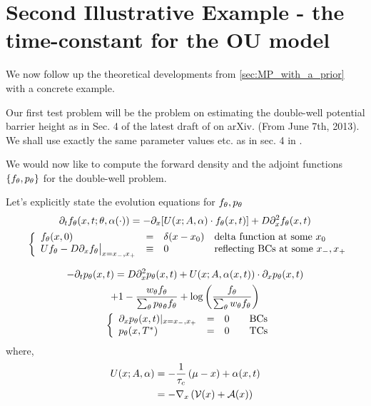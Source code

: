 \documentclass{article}
\begin{document}
\clearpage

\section{Second Illustrative Example - the time-constant for the OU model}
\label{sec:MP_Doublewell_TimeDependent}
We now follow up the theoretical developments from \cref{sec:MP_with_a_prior}
with a concrete example.

Our first test problem will be the problem on estimating the double-well
potential barrier height as in Sec. 4 of the latest draft of \cite{Lin} on
arXiv. (From June 7th, 2013). We shall use exactly the same parameter values
etc. as in sec. 4 in \cite{Lin}.

We would now like to compute the forward density and the adjoint functions
$\{{ f_{\theta}}, { p_{\theta}}\}$ for the double-well problem.

Let's explicitly state the evolution equations for ${ f_{\theta}},{ p_{\theta}}$
\begin{equation}
\begin{gathered}
{\partial}_t { f_{\theta}}(x,t; {\theta}, {\alpha}(\cdot)) = -{\partial}_x [ U(x;A, {\alpha}) \cdot { f_{\theta}}(x,t)] + D {\partial}_x^2
{ f_{\theta}}(x,t)
\\
\begin{array}{ll}
	&
	\left\{ \begin{array}{lcll}
	 { f_{\theta}}(x,0) &=& \delta(x-x_0)  &\textrm{delta function at some } x_0
	\\
	U { f_{\theta}} - D {\partial}_x { f_{\theta}} \big|_{x={ x_{-} },{ x_{+} }} &\equiv& 0 & \textrm{reflecting BCs
	at some } { x_{-} }, { x_{+} } \end{array} \right.
\end{array}
\label{eq:forward_density_double_well}
\end{gathered}
\end{equation}

\begin{equation}
\begin{gathered}
-{\partial}_t { p_{\theta}}(x,t) =
D {\partial}_x^2 { p_{\theta}}(x,t) +
U(x;A, {\alpha}(x,t))\cdot {\partial}_x { p_{\theta}}(x,t) \\
+ 1 - \frac{  w_{\theta} { f_{\theta}} }{\sum_{\theta} { p_{\theta}}_{\theta}{ f_{\theta}}} 
+ \log\left(\frac{f_{\theta}} {\sum_{\theta} { w_{\theta} } { f_{\theta}} }\right)
\\
\begin{array}{ll}
	&
	\left\{ \begin{array}{lcll}
	{\partial}_x { p_{\theta}}(x, t)|_{x = { x_{-} }, { x_{+} }}  &=& 0  \quad &\textrm{BCs}
	\\
	{ p_{\theta}}(x,{ T^* })  &=& 0 \,& \textrm{TCs}
\end{array} \right.
\end{array}
\label{eq:backward_adjoint_double_well}
\end{gathered}
\end{equation}
where,  
\begin{eqnarray*}
U(x; A, {\alpha}) &= -\frac 1 {{ \tau_{c} }} \left( {\mu } -x \right) + {\alpha}(x,t)
\\
&= -{ \nabla }_x \left(\mathcal V(x) + \mathcal{A}(x) \right)
\end{eqnarray*}
\end{document}
